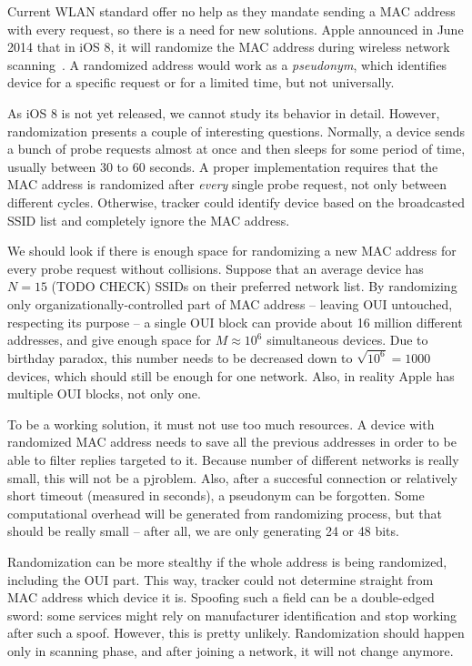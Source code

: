 \documentclass[12pt,a4paper,oneside,pdftex]{report}
\begin{document}
Current WLAN standard offer no help as they mandate sending a MAC address with every request, so there is a need for new solutions. Apple announced in June 2014 that in iOS 8, it will randomize the MAC address during wireless network scanning~\cite{FredericJacobs2014,apple_wwdc_privacy}. A randomized address would work as a \emph{pseudonym}, which identifies device for a specific request or for a limited time, but not universally.

As iOS 8 is not yet released, we cannot study its behavior in detail. However, randomization presents a couple of interesting questions. Normally, a device sends a bunch of probe requests almost at once and then sleeps for some period of time, usually between 30 to 60 seconds. A proper implementation requires that the MAC address is randomized after \emph{every} single probe request, not only between different cycles. Otherwise, tracker could identify device based on the broadcasted SSID list and completely ignore the MAC address.

We should look if there is enough space for randomizing a new MAC address for every probe request without collisions. Suppose that an average device has $N = 15$ (TODO CHECK) SSIDs on their preferred network list. By randomizing only organizationally-controlled part of MAC address -- leaving OUI untouched, respecting its purpose -- a single OUI block can provide about 16 million different addresses, and give enough space for $M \approx 10^6$ simultaneous devices. Due to birthday paradox, this number needs to be decreased down to $\sqrt{10^6} = 1000$ devices, which should still be enough for one network. Also, in reality Apple has multiple OUI blocks, not only one.

To be a working solution, it must not use too much resources. A device with randomized MAC address needs to save all the previous addresses in order to be able to filter replies targeted to it. Because number of different networks is really small, this will not be a pjroblem. Also, after a succesful connection or relatively short timeout (measured in seconds), a pseudonym can be forgotten. Some computational overhead will be generated from randomizing process, but that should be really small -- after all, we are only generating 24 or 48 bits.

Randomization can be more stealthy if the whole address is being randomized, including the OUI part. This way, tracker could not determine straight from MAC address which device it is. Spoofing such a field can be a double-edged sword: some services might rely on manufacturer identification and stop working after such a spoof. However, this is pretty unlikely. Randomization should happen only in scanning phase, and after joining a network, it will not change anymore.
\end{document}
